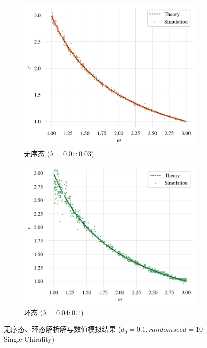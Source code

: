 \documentclass{article}
\begin{document}
\begin{figure}[H]
	\centering
	\begin{subfigure}[b]{0.49\textwidth}
		\includegraphics[width=\textwidth]{./figs/DisorderStateRadius.png}
		\vspace{-1cm}
		\caption{无序态 ($\lambda=0.01:0.03$)}
	\end{subfigure}
	\begin{subfigure}[b]{0.49\textwidth}
		\includegraphics[width=\textwidth]{./figs/RingStateRadios.png}
		\vspace{-1cm}
		\caption{环态 ($\lambda=0.04:0.1$)}
	\end{subfigure}
	\vspace{-0.5cm}
	\caption{无序态、环态解析解与数值模拟结果 ($d_0=0.1, random seed=10$ Single Chirality)}
	\label{fig:fig21.2}
\end{figure}
\end{document}
